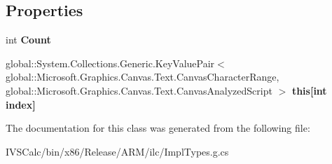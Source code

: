 \subsection*{Properties}
\begin{DoxyCompactItemize}
\item 
\mbox{\label{class_system_1_1_collections_1_1_generic_1_1_i_read_only_list___a___system___collections___generdec03126cb21efe263930a396eccb785_aa01d381b2a6202b0f859e8c940188aa8}} 
int {\bfseries Count}
\item 
\mbox{\label{class_system_1_1_collections_1_1_generic_1_1_i_read_only_list___a___system___collections___generdec03126cb21efe263930a396eccb785_ab84854a2066e60b0e1446a176d8438dd}} 
global\+::\+System.\+Collections.\+Generic.\+Key\+Value\+Pair$<$ global\+::\+Microsoft.\+Graphics.\+Canvas.\+Text.\+Canvas\+Character\+Range, global\+::\+Microsoft.\+Graphics.\+Canvas.\+Text.\+Canvas\+Analyzed\+Script $>$ {\bfseries this\mbox{[}int index\mbox{]}}
\end{DoxyCompactItemize}


The documentation for this class was generated from the following file\+:\begin{DoxyCompactItemize}
\item 
I\+V\+S\+Calc/bin/x86/\+Release/\+A\+R\+M/ilc/Impl\+Types.\+g.\+cs\end{DoxyCompactItemize}
